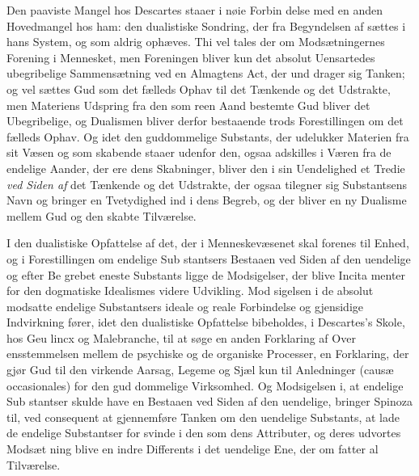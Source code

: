 \documentclass[12pt,a4paper]{book}
\begin{document}
Den paaviste Mangel hos Descartes staaer i nøie Forbin\-%
delse med en anden Hovedmangel hos ham: den dualistiske
Sondring, der fra Begyndelsen af sættes i hans System, og som
aldrig ophæves. Thi vel tales der om Modsætningernes Forening i
Mennesket, men Foreningen bliver kun det absolut Uensartedes
ubegribelige Sammensætning ved en Almagtens Act, der und\-%
drager sig Tanken; og vel sættes Gud som det fælleds Ophav
til det Tænkende og det Udstrakte, men Materiens Udspring
fra den som reen Aand bestemte Gud bliver det Ubegribelige,
og Dualismen bliver derfor bestaaende trods Forestillingen om
det fælleds Ophav. Og idet den guddommelige Substants, der
udelukker Materien fra sit Væsen og som skabende staaer
udenfor den, ogsaa adskilles i Væren fra de endelige Aander,
der ere dens Skabninger, bliver den i sin Uendelighed et
Tredie \emph{ved Siden af} det Tænkende og det Udstrakte, der
ogsaa tilegner sig Substantsens Navn og bringer en Tvetydighed
ind i dens Begreb, og der bliver en ny Dualisme mellem Gud
og den skabte Tilværelse.

I den dualistiske Opfattelse af det, der i Menneskevæsenet
skal forenes til Enhed, og i Forestillingen om endelige Sub\-%
stantsers Bestaaen ved Siden af den uendelige og efter Be\-%
grebet eneste Substants ligge de Modsigelser, der blive Incita\-%
menter for den dogmatiske Idealismes videre Udvikling. Mod\-%
sigelsen i de absolut modsatte endelige Substantsers ideale og
reale Forbindelse og gjensidige Indvirkning fører, idet den
dualistiske Opfattelse bibeholdes, i Descartes's Skole, hos Geu\-%
lincx og Malebranche, til at søge en anden Forklaring af Over\-%
ensstemmelsen mellem de psychiske og de organiske Processer,
en Forklaring, der gjør Gud til den virkende Aarsag, Legeme
og Sjæl kun til Anledninger (causæ occasionales) for den gud\-%
dommelige Virksomhed. Og Modsigelsen i, at endelige Sub\-%
stantser skulde have en Bestaaen ved Siden af den uendelige,
bringer Spinoza til, ved consequent at gjennemføre Tanken om
den uendelige Substants, at lade de endelige Substantser for\-%
svinde i den som dens Attributer, og deres udvortes Modsæt\-%
ning blive en indre Differents i det uendelige Ene, der om\-%
fatter al Tilværelse.
\end{document}

